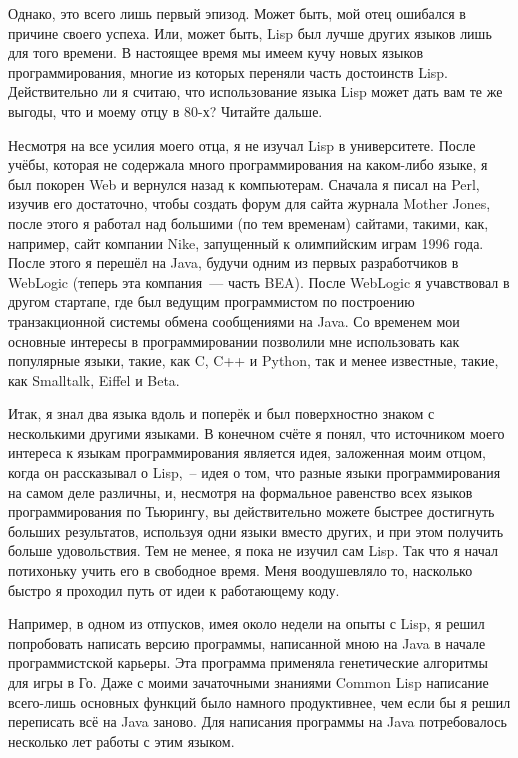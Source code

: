 Однако, это всего лишь первый эпизод. Может быть, мой отец ошибался в причине своего
успеха. Или, может быть, Lisp был лучше других языков лишь для того времени. В настоящее
время мы имеем кучу новых языков программирования, многие из которых переняли часть
достоинств Lisp. Действительно ли я считаю, что использование языка Lisp может дать вам те
же выгоды, что и моему отцу в 80-х? Читайте дальше.

Несмотря на все усилия моего отца, я не изучал Lisp в университете. После учёбы, которая
не содержала много программирования на каком-либо языке, я был покорен Web и вернулся
назад к компьютерам. Сначала я писал на Perl, изучив его достаточно, чтобы создать форум
для сайта журнала Mother Jones, после этого я работал над большими (по тем временам)
сайтами, такими, как, например, сайт компании Nike, запущенный к олимпийским играм 1996
года. После этого я перешёл на Java, будучи одним из первых разработчиков в WebLogic
(теперь эта компания~--- часть BEA). После WebLogic я учавствовал в другом стартапе, где
был ведущим программистом по построению транзакционной системы обмена сообщениями на
Java. Со временем мои основные интересы в программировании позволили мне использовать как
популярные языки, такие, как C, C++ и Python, так и менее известные, такие, как Smalltalk,
Eiffel и Beta.

Итак, я знал два языка вдоль и поперёк и был поверхностно знаком с несколькими другими
языками. В конечном счёте я понял, что источником моего интереса к языкам программирования
является идея, заложенная моим отцом, когда он рассказывал о Lisp,~-- идея о том, что
разные языки программирования на самом деле различны, и, несмотря на формальное равенство
всех языков программирования по Тьюрингу, вы действительно можете быстрее достигнуть
больших результатов, используя одни языки вместо других, и при этом получить больше
удовольствия. Тем не менее, я пока не изучил сам Lisp. Так что я начал потихоньку учить
его в свободное время. Меня воодушевляло то, насколько быстро я проходил путь от идеи к
работающему коду.

Например, в одном из отпусков, имея около недели на опыты с Lisp, я решил попробовать
написать версию программы, написанной мною на Java в начале программистской карьеры. Эта
программа применяла генетические алгоритмы для игры в Го. Даже с моими зачаточными
знаниями Common Lisp написание всего-лишь основных функций было намного продуктивнее, чем
если бы я решил переписать всё на Java заново. Для написания программы на Java
потребовалось несколько лет работы с этим языком.

